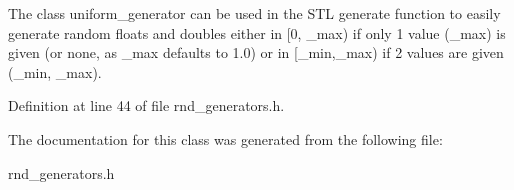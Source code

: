 The class uniform\_\-generator can be used in the STL generate function to easily generate random floats and doubles either in [0, \_\-max) if only 1 value (\_\-max) is given (or none, as \_\-max defaults to 1.0) or in [\_\-min,\_\-max) if 2 values are given (\_\-min, \_\-max). 



Definition at line 44 of file rnd\_\-generators.h.

The documentation for this class was generated from the following file:\begin{CompactItemize}
\item 
rnd\_\-generators.h\end{CompactItemize}
